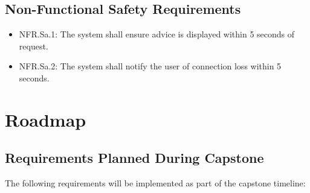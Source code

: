 \documentclass{article}
\begin{document}
\subsection{Non-Functional Safety Requirements}
\begin{itemize}
    \item NFR.Sa.1: The system shall ensure advice is displayed within 5 seconds of request.
    \item NFR.Sa.2: The system shall notify the user of connection loss within 5 seconds.
\end{itemize}


\section{Roadmap}\label{sec:roadmap}

\subsection{Requirements Planned During Capstone}\label{subsec:requirements-planned-during-capstone}
The following requirements will be implemented as part of the capstone timeline:
\end{document}
